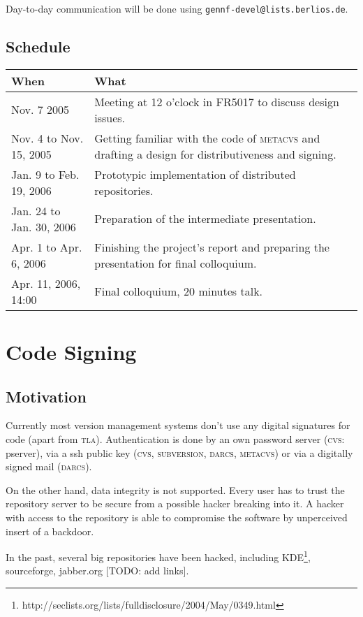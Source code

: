 \documentclass[fleqn, 10pt, a4paper]{article}
\begin{document}
Day-to-day communication will be done using
\texttt{gennf-devel@lists.berlios.de}.


\subsection{Schedule \label{schedule}}

\begin{tabular}{|p{}|p{}|}
  \hline
  \textmd{When} & \textmd{What} \\
  \hline\hline
  Nov. 7 2005 &
  Meeting at 12 o'clock in FR5017 to discuss design issues. \\
  \hline
  Nov. 4 to Nov. 15, 2005 &
  Getting familiar with the code of \textsc{metacvs}
  and drafting a design for distributiveness and signing. \\
  \hline
  Jan. 9 to Feb. 19, 2006 & Prototypic implementation of
  distributed repositories. \\
  \hline
  Jan. 24 to Jan. 30, 2006 & Preparation of the intermediate
  presentation. \\
  \hline
  Apr. 1 to Apr. 6, 2006 & Finishing the project's report
  and preparing the presentation for final colloquium. \\
  \hline
  Apr. 11, 2006, 14:00 & Final colloquium, 20 minutes talk.
  \hline
\end{tabular}


\section{Code Signing}

\subsection{Motivation}
Currently most version management systems don't use any digital signatures
for code (apart from \textsc{tla}). Authentication is done by an own password
server (\textsc{cvs}: pserver), via a ssh public key (\textsc{cvs},
\textsc{subversion}, \textsc{darcs}, \textsc{metacvs}) or
via a digitally signed mail (\textsc{darcs}).

On the other hand, data integrity is not supported.
Every user has to trust the repository server
to be secure from a possible hacker breaking into it.
A hacker with access to the repository is able to compromise the
software by unperceived insert of a backdoor.

In the past, several big repositories have been hacked, including
KDE\footnote{http://seclists.org/lists/fulldisclosure/2004/May/0349.html},
sourceforge, jabber.org [TODO: add links].
\end{document}
